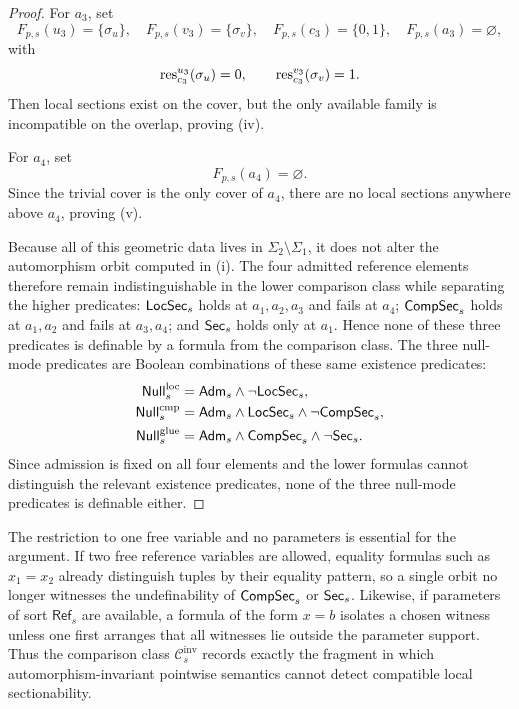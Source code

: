 \begin{proof}
For $a_3$, set
\[
F_{p,s}(u_3)=\{\sigma_u\},
\quad
F_{p,s}(v_3)=\{\sigma_v\},
\quad
F_{p,s}(c_3)=\{0,1\},
\quad
F_{p,s}(a_3)=\varnothing,
\]
with
\[
\mathrm{res}_{c_3}^{u_3}(\sigma_u)=0,
\qquad
\mathrm{res}_{c_3}^{v_3}(\sigma_v)=1.
\]
Then local sections exist on the cover, but the only available family is incompatible on the overlap, proving \textup{(iv)}.

For $a_4$, set
\[
F_{p,s}(a_4)=\varnothing.
\]
Since the trivial cover is the only cover of $a_4$, there are no local sections anywhere above $a_4$, proving \textup{(v)}.

Because all of this geometric data lives in $\Sigma_2\setminus\Sigma_1$, it does not alter the automorphism orbit computed in \textup{(i)}. The four admitted reference elements therefore remain indistinguishable in the lower comparison class while separating the higher predicates: $\mathsf{LocSec}_s$ holds at $a_1,a_2,a_3$ and fails at $a_4$; $\mathsf{CompSec}_s$ holds at $a_1,a_2$ and fails at $a_3,a_4$; and $\mathsf{Sec}_s$ holds only at $a_1$.
Hence none of these three predicates is definable by a formula from the comparison class. The three null-mode predicates are Boolean combinations of these same existence predicates:
\begin{align*}
\mathsf{Null}_s^{\mathrm{loc}}&=\mathsf{Adm}_s\land \neg\mathsf{LocSec}_s,\\
\mathsf{Null}_s^{\mathrm{cmp}}&=\mathsf{Adm}_s\land \mathsf{LocSec}_s\land \neg\mathsf{CompSec}_s,\\
\mathsf{Null}_s^{\mathrm{glue}}&=\mathsf{Adm}_s\land \mathsf{CompSec}_s\land \neg\mathsf{Sec}_s.
\end{align*}
Since admission is fixed on all four elements and the lower formulas cannot distinguish the relevant existence predicates, none of the three null-mode predicates is definable either.
\end{proof}

\begin{remark}\label{rem:tuple-parameter-limitation}
The restriction to one free variable and no parameters is essential for the argument. If two free reference variables are allowed, equality formulas such as $x_1=x_2$ already distinguish tuples by their equality pattern, so a single orbit no longer witnesses the undefinability of $\mathsf{CompSec}_s$ or $\mathsf{Sec}_s$. Likewise, if parameters of sort $\mathsf{Ref}_s$ are available, a formula of the form $x=b$ isolates a chosen witness unless one first arranges that all witnesses lie outside the parameter support. Thus the comparison class $\mathcal{C}_{s}^{\mathrm{inv}}$ records exactly the fragment in which automorphism-invariant pointwise semantics cannot detect compatible local sectionability.
\end{remark}
